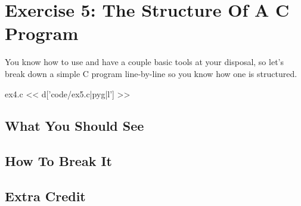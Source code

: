\chapter{Exercise 5: The Structure Of A C Program}

You know how to use  and have a couple basic tools
at your disposal, so let's break down a simple C program line-by-line
so you know how one is structured.

\begin{code}{ex4.c}
<< d['code/ex5.c|pyg|l'] >>
\end{code}


\section{What You Should See}


\section{How To Break It}


\section{Extra Credit}



